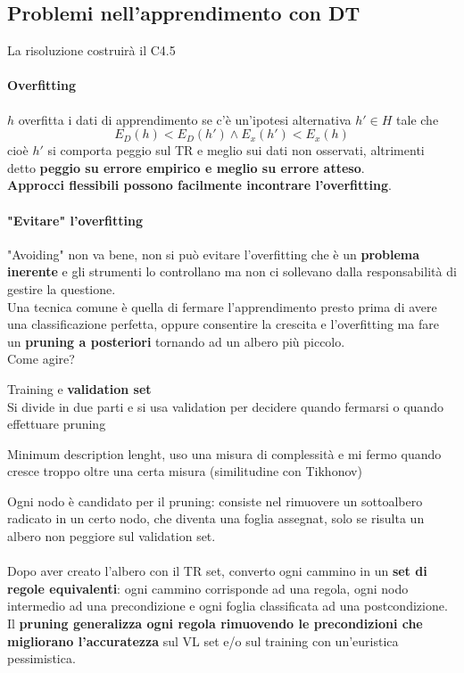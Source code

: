 \documentclass[10pt]{book}
\begin{document}
\subsection{Problemi nell'apprendimento con DT}
La risoluzione costruirà il C4.5
\paragraph{Overfitting} %
$h$ overfitta i dati di apprendimento se c'è un'ipotesi alternativa $h' \in H$ tale che $$E_D(h) < E_D(h')\wedge E_x(h') < E_x(h)$$ cioè $h'$ si comporta peggio sul TR e meglio sui dati non osservati, altrimenti detto \textbf{peggio su errore empirico e meglio su errore atteso}.\\
\textbf{Approcci flessibili possono facilmente incontrare l'overfitting}.
\paragraph{"Evitare" l'overfitting} "Avoiding" non va bene, non si può evitare l'overfitting che è un \textbf{problema inerente} e gli strumenti lo controllano ma non ci sollevano dalla responsabilità di gestire la questione.\\
Una tecnica comune è quella di fermare l'apprendimento presto prima di avere una classificazione perfetta, oppure consentire la crescita e l'overfitting ma fare un \textbf{pruning a posteriori} tornando ad un albero più piccolo.\\
Come agire?
\begin{list}{}{}
	\item Training e \textbf{validation set}\\
	Si divide in due parti e si usa validation per decidere quando fermarsi o quando effettuare pruning
	\item Minimum description lenght, uso una misura di complessità e mi fermo quando cresce troppo oltre una certa misura (similitudine con Tikhonov)
\end{list}
Ogni nodo è candidato per il pruning: consiste nel rimuovere un sottoalbero radicato in un certo nodo, che diventa una foglia assegnat, solo se risulta un albero non peggiore sul validation set.\\\\
Dopo aver creato l'albero con il TR set, converto ogni cammino in un \textbf{set di regole equivalenti}: ogni cammino corrisponde ad una regola, ogni nodo intermedio ad una precondizione e ogni foglia classificata ad una postcondizione. Il \textbf{pruning generalizza ogni regola rimuovendo le precondizioni che migliorano l'accuratezza} sul VL set e/o sul training con un'euristica pessimistica.
\end{document}
